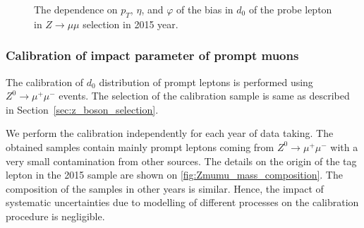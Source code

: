 \begin{figure}[htbp]
\caption{
  The dependence on $p_T$, $\eta$, and $\varphi$ of the bias in $d_0$ of the probe lepton in $Z \rightarrow \mu\mu$ selection in 2015 year.
}
\label{fig:d0_bias_eat_pt}
\end{figure}



\subsubsection{Calibration of impact parameter of prompt muons}
\label{sec:d0calibration_of_prompt_muons}

The calibration of $d_0$ distribution of prompt leptons is performed using $Z^{0}\rightarrow\mu^{+}\mu^{-}$ events. The selection of the calibration sample is same as described in Section~\ref{sec:z_boson_selection}.

We perform the calibration independently for each year of data taking.
The obtained samples contain mainly prompt leptons coming from $Z^{0}\rightarrow\mu^{+}\mu^{-}$ with a very small contamination from other sources.
The details on the origin of the tag lepton in the 2015 sample are shown on \ref{fig:Zmumu_mass_composition}.
The composition of the samples in other years is similar.
Hence, the impact of systematic uncertainties due to modelling of different processes on the calibration procedure is negligible.

